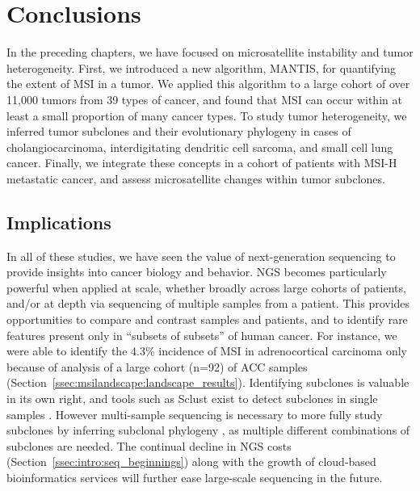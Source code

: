 \chapter{Conclusions}
\label{ch:conclusions}
In the preceding chapters, we have focused on microsatellite instability and tumor heterogeneity. First, we introduced a new algorithm, MANTIS, for quantifying the extent of MSI in a tumor. We applied this algorithm to a large cohort of over 11,000 tumors from 39 types of cancer, and found that MSI can occur within at least a small proportion of many cancer types. To study tumor heterogeneity, we inferred tumor subclones and their evolutionary phylogeny in cases of cholangiocarcinoma, interdigitating dendritic cell sarcoma, and small cell lung cancer. Finally, we integrate these concepts in a cohort of patients with MSI-H metastatic cancer, and assess microsatellite changes within tumor subclones.

\section{Implications}
In all of these studies, we have seen the value of next-generation sequencing to provide insights into cancer biology and behavior. NGS becomes particularly powerful when applied at scale, whether broadly across large cohorts of patients, and/or at depth via sequencing of multiple samples from a patient. This provides opportunities to compare and contrast samples and patients, and to identify rare features present only in ``subsets of subsets'' of human cancer. For instance, we were able to identify the 4.3\% incidence of MSI in adrenocortical carcinoma only because of analysis of a large cohort (n=92) of ACC samples (Section~\ref{ssec:msilandscape:landscape_results}). Identifying subclones is valuable in its own right, and tools such as Sclust exist to detect subclones in single samples \cite{cun2018}. However multi-sample sequencing is necessary to more fully study subclones by inferring subclonal phylogeny \cite{tarabichi2021}, as multiple different combinations of subclones are needed. The continual decline in NGS costs (Section~\ref{ssec:intro:seq_beginnings}) along with the growth of cloud-based bioinformatics services \cite{banibaker2020} will further ease large-scale sequencing in the future.

